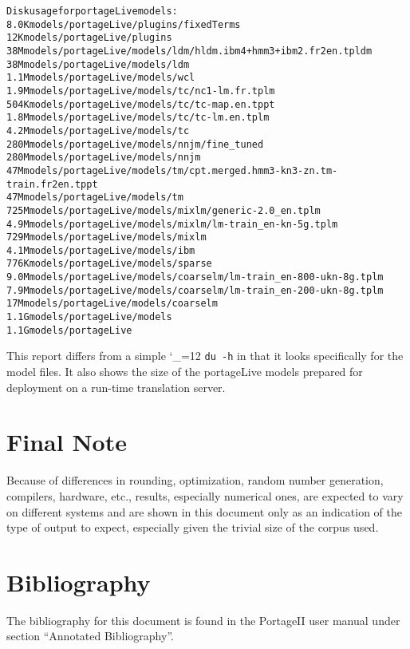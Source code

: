 \documentclass[11pt,letterpaper]{article}
\newcommand{\PS}{PortageII\xspace}
\def\code{\begingroup\catcode`\_=12 \codex}
\newcommand{\codex}[1]{\texttt{#1}\endgroup}
\begin{document}
\begin{small}
\begin{alltt}
   Disk usage for portageLive models:
   8.0K    models/portageLive/plugins/fixedTerms
   12K     models/portageLive/plugins
   38M     models/portageLive/models/ldm/hldm.ibm4+hmm3+ibm2.fr2en.tpldm
   38M     models/portageLive/models/ldm
   1.1M    models/portageLive/models/wcl
   1.9M    models/portageLive/models/tc/nc1-lm.fr.tplm
   504K    models/portageLive/models/tc/tc-map.en.tppt
   1.8M    models/portageLive/models/tc/tc-lm.en.tplm
   4.2M    models/portageLive/models/tc
   280M    models/portageLive/models/nnjm/fine_tuned
   280M    models/portageLive/models/nnjm
   47M     models/portageLive/models/tm/cpt.merged.hmm3-kn3-zn.tm-train.fr2en.tppt
   47M     models/portageLive/models/tm
   725M    models/portageLive/models/mixlm/generic-2.0_en.tplm
   4.9M    models/portageLive/models/mixlm/lm-train_en-kn-5g.tplm
   729M    models/portageLive/models/mixlm
   4.1M    models/portageLive/models/ibm
   776K    models/portageLive/models/sparse
   9.0M    models/portageLive/models/coarselm/lm-train_en-800-ukn-8g.tplm
   7.9M    models/portageLive/models/coarselm/lm-train_en-200-ukn-8g.tplm
   17M     models/portageLive/models/coarselm
   1.1G    models/portageLive/models
1.1G    models/portageLive
\end{alltt}
\end{small}

This report differs from a simple \code{du -h} in that it looks specifically
for the model files. It also shows the size of the portageLive models prepared
for deployment on a run-time translation server.

\section*{Final Note}
Because of differences in rounding, optimization, random number generation,
compilers, hardware, etc., results, especially numerical ones, are expected to
vary on different systems and are shown in this document only as an indication
of the type of output to expect, especially given the trivial size of the
corpus used.

\section*{Bibliography}
The bibliography for this document is found in the \PS user manual under
section ``Annotated Bibliography''.
\end{document}
